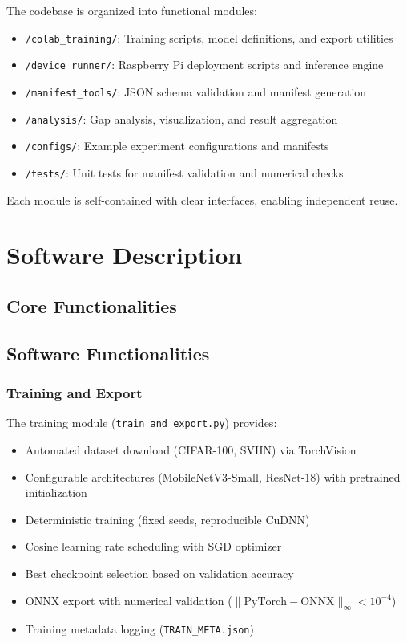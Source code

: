 \documentclass[review]{elsarticle}
\begin{document}
The codebase is organized into functional modules:

\begin{itemize}
\item \texttt{/colab\_training/}: Training scripts, model definitions, and export utilities
\item \texttt{/device\_runner/}: Raspberry Pi deployment scripts and inference engine
\item \texttt{/manifest\_tools/}: JSON schema validation and manifest generation
\item \texttt{/analysis/}: Gap analysis, visualization, and result aggregation
\item \texttt{/configs/}: Example experiment configurations and manifests
\item \texttt{/tests/}: Unit tests for manifest validation and numerical checks
\end{itemize}

Each module is self-contained with clear interfaces, enabling independent reuse.

\section{Software Description}
\label{sec:software-description}

\subsection{Core Functionalities}

\subsection{Software Functionalities}

\subsubsection{Training and Export}

The training module (\texttt{train\_and\_export.py}) provides:

\begin{itemize}
\item Automated dataset download (CIFAR-100, SVHN) via TorchVision
\item Configurable architectures (MobileNetV3-Small, ResNet-18) with pretrained initialization
\item Deterministic training (fixed seeds, reproducible CuDNN)
\item Cosine learning rate scheduling with SGD optimizer
\item Best checkpoint selection based on validation accuracy
\item ONNX export with numerical validation ($\lVert\text{PyTorch} - \text{ONNX}\rVert_\infty < 10^{-4}$)
\item Training metadata logging (\texttt{TRAIN\_META.json})
\end{itemize}
\end{document}
